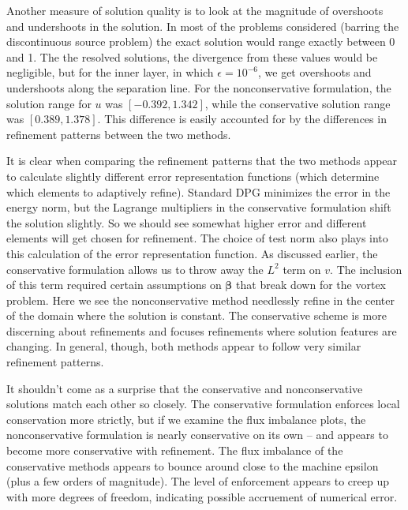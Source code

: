 \documentclass[letterpaper]{article}
\def\bbeta{\boldsymbol\beta}
\begin{document}
Another measure of solution quality is to look at the magnitude of overshoots
and undershoots in the solution. In most of the problems considered (barring
the discontinuous source problem) the exact solution would range exactly
between 0 and 1. The the resolved solutions, the divergence from these values
would be negligible, but for the inner layer, in which $\epsilon=10^{-6}$, we
get overshoots and undershoots along the separation line. For the
nonconservative formulation, the solution range for $u$ was $[-0.392,1.342]$,
while the conservative solution range was $[0.389,1.378]$. This difference is
easily accounted for by the differences in refinement patterns between the two
methods.

It is clear when comparing the refinement patterns that the two methods appear
to calculate slightly different error representation functions (which
determine which elements to adaptively refine). Standard DPG minimizes the
error in the energy norm, but the Lagrange multipliers in the conservative
formulation shift the solution slightly. So we should see somewhat higher
error and different elements will get chosen for refinement. The choice of
test norm also plays into this calculation of the error representation
function. As discussed earlier, the conservative formulation allows us to
throw away the $L^2$ term on $v$. The inclusion of this term required certain
assumptions on $\bbeta$ \cite{ChanHeuerThanhDemkowicz2012} that break down for
the vortex problem. Here we see the nonconservative method needlessly refine
in the center of the domain where the solution is constant. The conservative
scheme is more discerning about refinements and focuses refinements where
solution features are changing. In general, though, both methods appear to
follow very similar refinement patterns.

It shouldn't come as a surprise that the conservative and nonconservative
solutions match each other so closely. The conservative formulation
enforces local conservation more strictly, but if we examine the flux
imbalance plots, the nonconservative formulation is nearly conservative on its
own -- and appears to become more conservative with refinement. The flux
imbalance of the conservative methods appears to bounce around close to the
machine epsilon (plus a few orders of magnitude). The level of enforcement
appears to creep up with more degrees of freedom, indicating possible
accruement of numerical error.


 
 
\end{document}
